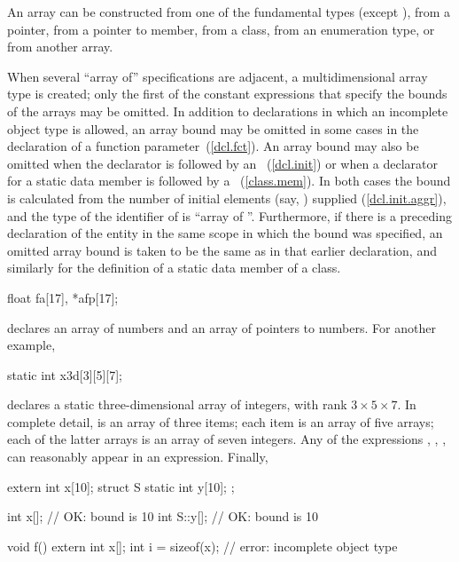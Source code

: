 \pnum
An array can be constructed from one of the fundamental types
(except
),
from a pointer,
from a pointer to member, from a class,
from an enumeration type,
or from another array.

\pnum
When several ``array of'' specifications are adjacent, a multidimensional
array type is created;
only the first of
the constant expressions that specify the bounds
of the arrays may be omitted.
In addition to declarations in which an incomplete object type is allowed,
an array bound may be omitted in some cases in the declaration of a function
parameter~(\ref{dcl.fct}).
An array bound may also be omitted
when the declarator is followed by an
~(\ref{dcl.init}) or
when a declarator for a static data member is followed by a
~(\ref{class.mem}).
In both cases the bound is calculated from the number
%
of initial elements (say,
)
supplied
(\ref{dcl.init.aggr}), and the type of the identifier of
is ``array of
''.
Furthermore, if there is a preceding declaration of the entity in the same
scope in which the bound was specified, an omitted array bound is taken to
be the same as in that earlier declaration, and similarly for the definition
of a static data member of a class.

\pnum
\begin{example}
%
%
\begin{codeblock}
float fa[17], *afp[17];
\end{codeblock}

declares an array of
numbers and an array of
pointers to
numbers.
%
For another example,

\begin{codeblock}
static int x3d[3][5][7];
\end{codeblock}

declares a static three-dimensional array of integers,
with rank $3 \times 5 \times 7$.
In complete detail,
is an array of three items;
each item is an array of five arrays;
each of the latter arrays is an array of seven
integers.
Any of the expressions
,
,
,
can reasonably appear in an expression. Finally,
\begin{codeblock}
extern int x[10];
struct S {
  static int y[10];
};

int x[];                      // OK: bound is 10
int S::y[];                   // OK: bound is 10

void f() {
  extern int x[];
  int i = sizeof(x);          // error: incomplete object type
}
\end{codeblock}
\end{example}

